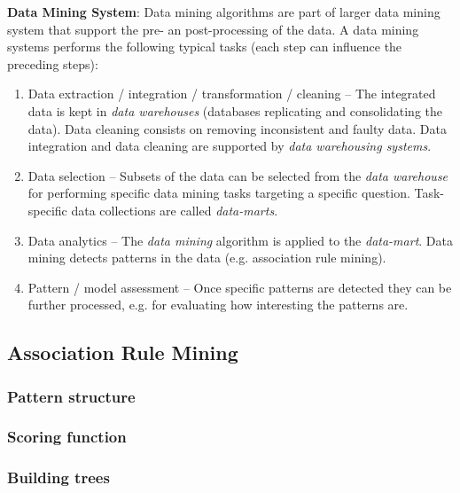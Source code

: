   \textbf{Data Mining System}: Data mining algorithms are part of larger data mining system that support the pre- an post-processing of the data. A data mining systems performs the following typical tasks (each step can influence the preceding steps):
  \begin{enumerate}
    \item Data extraction / integration / transformation / cleaning -- The integrated data is kept in \emph{data warehouses} (databases replicating and consolidating the data). Data cleaning consists on removing inconsistent and faulty data. Data integration and data cleaning are supported by \emph{data warehousing systems}.
    \item Data selection -- Subsets of the data can be selected from the \emph{data warehouse} for performing specific data mining tasks targeting a specific question. Task-specific data collections are called \emph{data-marts}.
    \item Data analytics -- The \emph{data mining} algorithm is applied to the \emph{data-mart}. Data mining detects patterns in the data (e.g. association rule mining).
    \item Pattern / model assessment -- Once specific patterns are detected they can be further processed, e.g. for evaluating how interesting the patterns are.
  \end{enumerate}

\subsection{Association Rule Mining} %
\label{sub:association_rule_mining}
  \subsubsection{Pattern structure} %
  \label{ssub:pattern_structure}
  \subsubsection{Scoring function} %
  \label{ssub:scoring_function}
  \subsubsection{Building trees} %
  \label{ssub:building_trees}
